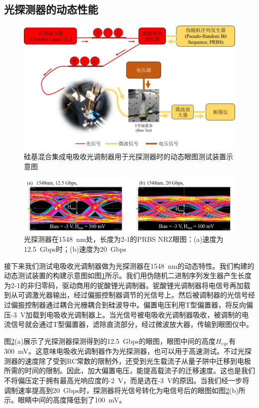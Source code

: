 \subsection{光探测器的动态性能}
\begin{figure}[htb]
	\centering
	\includegraphics[width=15cm]{./Pictures/chapt4_dynamic_measure_setup_pd.jpg}
	\caption{硅基混合集成电吸收光调制器用于光探测器时的动态眼图测试装置示意图}
	\label{chapt4_dynamic_measure_setup_pd}
\end{figure}
\begin{figure}[htb]
	\centering
	\includegraphics[width=15cm]{./Pictures/chapt4_eyediagram_pd.jpg}
	\caption{光探测器在1548~nm处，长度为2-1的PRBS NRZ眼图：(a)速度为12.5~Gbps时；(b)速度为20~Gbps}
	\label{chapt4_eyediagram_pd}
\end{figure}

接下来我们测试电吸收光调制器做为光探测器在1548~nm的动态特性。我们构建的动态测试装置的构建示意图如图\ref{chapt4_dynamic_measure_setup_pd}所示。我们用伪随机二进制序列发生器产生长度为2-1的非归零码，驱动商用的铌酸锂光调制器。铌酸锂光调制器将电信号再加载到从可调激光器输出，经过偏振控制器调节的光信号上。然后被调制器的光信号经过偏振控制器通过耦合光栅耦合到硅波导中。偏置电压利用T型偏置器，将反向偏压-3~V加载到电吸收光调制器上。当光信号被电吸收光调制器吸收，被调制的电流信号就会通过T型偏置器，滤除直流部分，经过微波放大器，传输到眼图仪中。

图\ref{chapt4_eyediagram_pd}(a)展示了光探测器探测得到的12.5~Gbps的眼图，眼图中间的高度$H_{eye}$有300~mV。这意味电吸收光调制器作为光探测器，也可以用于高速测试。不过光探测器的速度除了受到RC常数的限制外，还受到光生载流子从量子阱中迁移到电极所需的时间的限制。因此，加大偏置电压，能提高载流子的迁移速度。这也是我们不将偏压定于拥有最高光响应度的-2~V，而是选在-3~V的原因。当我们经一步将调制速率提高到20~Gbps时，探测器将光信号转化为电信号后的眼图如图\ref{chapt4_eyediagram_pd}(b)所示。眼睛中间的高度降低到了100~mV。

